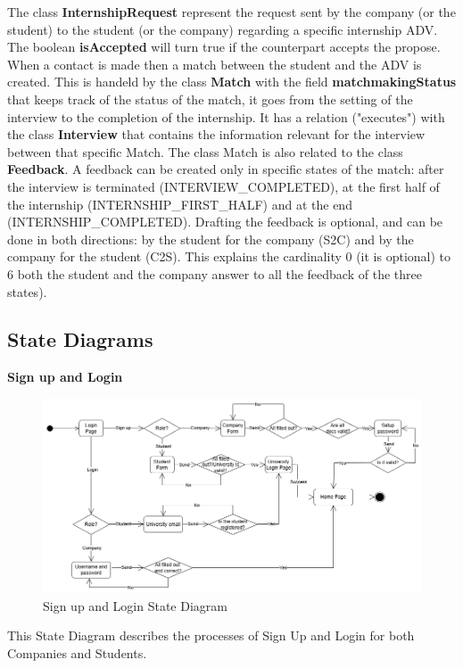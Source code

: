 The class \textbf{InternshipRequest} represent the request sent by the company (or the student) to the student (or the company) regarding a specific internship ADV. The boolean \textbf{isAccepted} will turn true if the counterpart accepts the propose. \newline
When a contact is made then a match between the student and the ADV is created. This is handeld by the class \textbf{Match} with the field \textbf{matchmakingStatus} that keeps track of the status of the match, it goes from the setting of the interview to the completion of the internship. It has a relation ("executes") with the class \textbf{Interview} that contains the information relevant for the interview between that specific Match. The class Match is also related to the class \textbf{Feedback}. A feedback can be created only in specific states of the match: after the interview is terminated ({INTERVIEW\_COMPLETED}), at the first half of the internship ({INTERNSHIP\_FIRST\_HALF}) and at the end ({INTERNSHIP\_COMPLETED}). Drafting the feedback is optional, and can be done in both directions: by the student for the company (S2C) and by the company for the student (C2S). This explains the cardinality 0 (it is optional) to 6 both the student and the company answer to all the feedback of the three states). 

\subsection{State Diagrams}
\textbf{Sign up and Login}\newline
\begin{figure}[H]
    \centering
    \includegraphics[width=15cm]{Images/State_Diagrams/RASD-SD-login_signup.drawio.png}
    \caption{Sign up and Login State Diagram}
\end{figure}
This State Diagram describes the processes of Sign Up and Login for both Companies and Students. 
\newline

